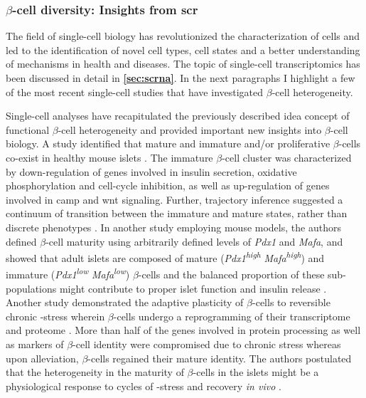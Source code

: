 
\subsubsection{$\beta$-cell diversity: Insights from \acrfull{scr}}

\par The field of single-cell biology has revolutionized the characterization of cells and led to the identification of novel cell types, cell states and a better understanding of mechanisms in health and diseases. The topic of single-cell transcriptomics has been discussed in detail in \textbf{\autoref{sec:scrna}}. In the next paragraphs I highlight a few of the most recent single-cell studies that have investigated $\beta$-cell heterogeneity.\\ 

\par Single-cell analyses have recapitulated the previously described idea concept of functional $\beta$-cell heterogeneity and provided important new insights into $\beta$-cell biology. A study identified that mature and immature and/or proliferative $\beta$-cells co-exist in healthy mouse islets \textbf{\cite{sachs_targeted_2020}}. The immature $\beta$-cell cluster was characterized by down-regulation of genes involved in insulin secretion, oxidative phosphorylation and cell-cycle inhibition, as well as up-regulation of genes involved in \gls{camp} and \gls{wnt} signaling. Further, trajectory inference suggested a continuum of transition between the immature and mature states, rather than discrete phenotypes \textbf{\cite{sachs_targeted_2020}}. In another study employing mouse models, the authors defined $\beta$-cell maturity using arbitrarily defined levels of \textit{Pdx1} and \textit{Mafa}, and showed that adult islets are composed of mature (\textit{Pdx1}\textsuperscript{\textit{high}} \textit{Mafa}\textsuperscript{\textit{high}}) and immature (\textit{Pdx1}\textsuperscript{\textit{low}} \textit{Mafa}\textsuperscript{\textit{low}}) $\beta$-cells and the balanced proportion of these sub-populations might contribute to proper islet function and insulin release \textbf{\cite{nasteska_pdx1low_2021}}. Another study demonstrated the adaptive plasticity of $\beta$-cells to reversible chronic -stress wherein $\beta$-cells undergo a reprogramming of their transcriptome and proteome \textbf{\cite{chen_adaptation_2022}}. More than half of the genes involved in  protein processing as well as markers of $\beta$-cell identity were compromised due to chronic stress whereas upon alleviation, $\beta$-cells regained their mature identity. The authors postulated that the heterogeneity in the maturity of $\beta$-cells in the islets might be a physiological response to cycles of -stress and recovery \textit{in vivo} \textbf{\cite{chen_adaptation_2022}}.\\

